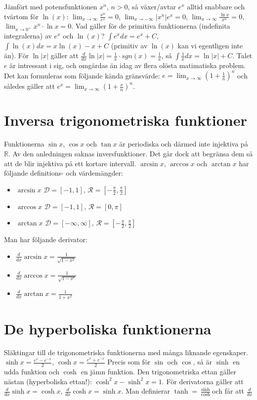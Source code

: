 Jämfört med potensfunktionen $x^n$, $n>0$, så växer/avtar $e^x$ alltid snabbare och tvärtom för $\ln(x)$:
$\lim_{x\to \infty}\frac{x^n}{e^x}=0$, $\lim_{x\to -\infty}|x^n|e^x=0$, $\lim_{x\to\infty}\frac{\ln x}{x^n}=0$, $\lim_{x\to 0^+}x^n\cdot \ln x=0$.
Vad gäller för de primitiva funktionerna (indefinita integralerna) av $e^x$ och $\ln(x)$?
$\int e^x dx=e^x+C$, $\int \ln(x)dx=x\ln(x)-x+C$ (primitiv av $\ln(x)$ kan vi egentligen inte än).
För $\ln |x|$ gäller att $\frac{d}{dx}\ln |x|=\frac{1}{x}\cdot sgn(x)=\frac{1}{x}$, så $\int \frac{1}{x}dx=\ln |x|+C$.
Talet $e$ är intressant i sig, och omgärdas än idag av flera olösta matimatiska problem.
Det kan formuleras som följande kända gränsvärde: $e=\lim_{x\to\infty}(1+\frac{1}{n})^n$ och således gäller att $e^x=\lim_{x\to\infty}(1+\frac{x}{n})^n$.
\section{Inversa trigonometriska funktioner}
Funktionerna $\sin x$, $\cos x$ och $\tan x$ är periodiska och därmed inte injektiva på $\mathbb{R}$.
Av den anledningen saknas inversfunktioner.
Det går dock att begränsa dem så att de blir injektiva på ett kortare intervall.
$\arcsin x$, $\arccos x$ och $\arctan x$ har följande definitions- och värdemängder:
\begin{itemize}
    \item $\arcsin x$ $\mathcal{D}=[-1,1]$, $\mathcal{R}=[-\frac{\pi}{2},\frac{\pi}{2}]$
    \item $\arccos x$ $\mathcal{D}=[-1,1]$, $\mathcal{R}=[0,\pi]$
    \item $\arctan x$ $\mathcal{D}=[-\infty,\infty]$, $\mathcal{R}=[-\frac{\pi}{2},\frac{\pi}{2}]$
\end{itemize}
Man har följande derivator:
\begin{itemize}
    \item $\frac{d}{dx} \arcsin x=\frac{1}{\sqrt{1-x^2}}$
    \item $\frac{d}{dx} \arccos x=\frac{1}{\sqrt{1-x^e}}$
    \item $\frac{d}{dx} \arctan x=\frac{1}{1+x^2}$
\end{itemize}
\section{De hyperboliska funktionerna}
Släktingar till de trigonometriska funktionerna med många liknande egenskaper.
$\sinh x = \frac{e^x-e^{-x}}{2}$, $\cosh x = \frac{e^x+e^{-x}}{2}$
Precis som för $\sin$ och $\cos$, så är $\sinh$ en udda funktion och $\cosh$ en jämn funktion.
Den trigonometriska ettan gäller nästan (hyperboliska ettan!): $\cosh^2 x - \sinh^2 x = 1$.
För derivatorna gäller att $\frac{d}{dx}\sinh x = \cosh x$, $\frac{d}{dx}\cosh x = \sinh x$.
Man definierar $\tanh = \frac{\sinh}{\cosh}$och får att $\frac{d}{dx}$